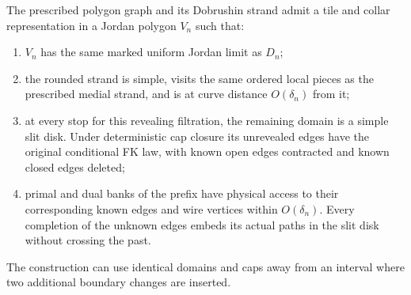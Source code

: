 \begin{lemma}\label{moving:drawing}
The prescribed polygon graph and its Dobrushin strand admit a tile
and collar representation in a Jordan polygon $V_n$ such that:
\begin{enumerate}[label=(\roman*)]
\item $V_n$ has the same marked uniform Jordan limit as $D_n$;
\item the rounded strand is simple, visits the same ordered local
pieces as the prescribed medial strand, and is at curve distance
$O(\delta_n)$ from it;
\item at every stop for this revealing filtration, the remaining domain
is a simple slit disk.  Under deterministic cap closure its unrevealed edges have
the original conditional FK law, with known open edges contracted
and known closed edges deleted;
\item primal and dual banks of the prefix have physical access to
their corresponding known edges and wire vertices within
$O(\delta_n)$.  Every completion of the unknown edges embeds its
actual paths in the slit disk without crossing the past.
\end{enumerate}
The construction can use identical domains and caps away from an
interval where two additional boundary changes are inserted.
\end{lemma}

